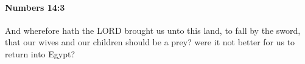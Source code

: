 
		\paragraph{Numbers 14:3} %
			\label{NUMBERS-14-3}

			And wherefore hath the LORD brought us unto this land, to fall by the sword, that our wives and our children should be a prey? were it not better for us to return into Egypt?


